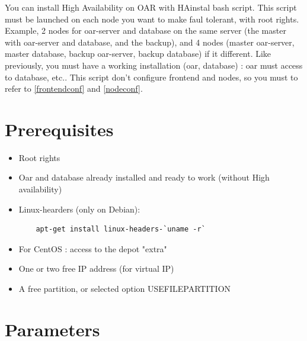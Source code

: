 \documentclass[a4paper,10pt]{report}
\begin{document}
You can install High Availability on OAR with HAinstal bash script. This script must be launched on each node you want to make faul tolerant, with root rights. Example, 2 nodes for oar-server and database on the same server (the master with oar-server and database, and the backup), and 4 nodes (master oar-server, master database, backup oar-server, backup database) if it different.
Like previously, you must have a working installation (oar, database) : oar must access to database, etc.. This script don't configure frontend and nodes, so you must to refer to \ref{frontendconf} and \ref{nodeconf}.

\section{Prerequisites}
\begin{itemize}
 \item Root rights
 \item Oar and database already installed and ready to work (without High availability)
 \item Linux-hearders (only on Debian): 
    \begin{lstlisting}
    apt-get install linux-headers-`uname -r`
    \end{lstlisting}
 \item For CentOS : access to the depot "extra"
 \item One or two free IP address (for virtual IP)
 \item A free partition, or selected option USEFILEPARTITION
\end{itemize}


\section{Parameters}
\end{document}
